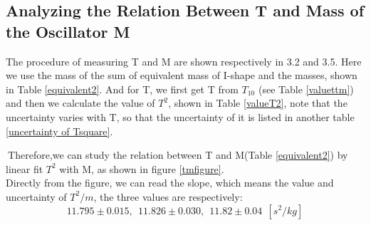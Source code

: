 \documentclass[11pt,a4paper]{article}
\begin{document}
\subsection{Analyzing the Relation Between T and Mass of the Oscillator M}
\qquad The procedure of measuring T and M are shown respectively in 3.2 and 3.5. Here we use the mass of the sum of equivalent mass of I-shape and the masses, shown in Table \ref{equivalent2}. And for T, we first get T from $T_{10}$ (see Table \ref{valuettm}) and then we calculate the value of $T^2$, shown in Table \ref{valueT2}, note that the uncertainty varies with T, so that the uncertainty of it is listed in another table \ref{uncertainty of Tsquare}.\par
$\ $Therefore,we can study the relation between T and M(Table \ref{equivalent2}) by linear fit $T^2$ with M, as shown in figure \ref{tmfigure}.\\
Directly from the figure, we can read the slope, which means the value and uncertainty of $T^2/m$, the three values are respectively:$$11.795\pm 0.015,\ \ 11.826\pm 0.030,\ \ 11.82\pm 0.04\ \ [s^2/kg]$$
\end{document}

